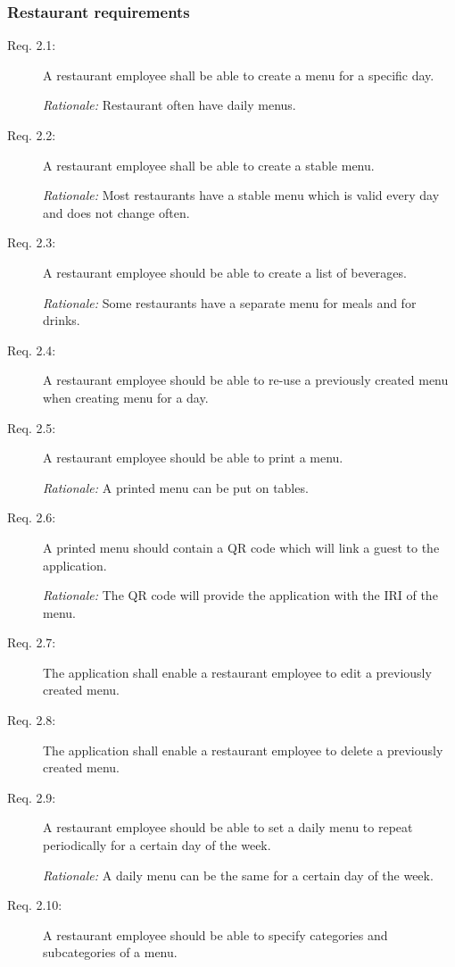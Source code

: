 \subsubsection{Restaurant requirements}
\begin{description}
    \item [Req. 2.1:] A restaurant employee shall be able to create a menu for a specific day.

    \emph{Rationale:} Restaurant often have daily menus.
    \item [Req. 2.2:] A restaurant employee shall be able to create a stable menu.

    \emph{Rationale:} Most restaurants have a stable menu which is valid every day and does not change often.
    \item [Req. 2.3:] A restaurant employee should be able to create a list of beverages.

    \emph{Rationale:} Some restaurants have a separate menu for meals and for drinks.
    \item [Req. 2.4:] A restaurant employee should be able to re-use a previously created menu when creating menu for a day.
    \item [Req. 2.5:] A restaurant employee should be able to print a menu.

    \emph{Rationale:} A printed menu can be put on tables.
    \item [Req. 2.6:] A printed menu should contain a QR code which will link a guest to the application.

    \emph{Rationale:} The QR code will provide the application with the IRI of the menu.
    \item [Req. 2.7:] The application shall enable a restaurant employee to edit a previously created menu.
    \item [Req. 2.8:] The application shall enable a restaurant employee to delete a previously created menu.
    \item [Req. 2.9:] A restaurant employee should be able to set a daily menu to repeat periodically for a certain day of the week.

    \emph{Rationale:} A daily menu can be the same for a certain day of the week.
    \item [Req. 2.10:] A restaurant employee should be able to specify categories and subcategories of a menu.


\end{description}
